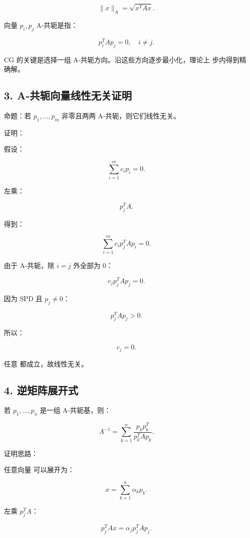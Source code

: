 \documentclass[11pt,a4paper]{ctexart}
\newcommand{\code}[1]{\begingroup\ttfamily\small #1\endgroup}
\begin{document}
\[
\|x\|_A=\sqrt{x^TAx}.
\]

向量 $p_i,p_j$ A-共轭是指：

\[
p_i^TAp_j=0,\quad i\ne j.
\]

CG 的关键是选择一组 A-共轭方向。沿这些方向逐步最小化，理论上 \code{} 步内得到精确解。


\subsection*{3. A-共轭向量线性无关证明}


命题：若 $p_1,\ldots,p_m$ 非零且两两 A-共轭，则它们线性无关。

证明：

假设：

\[
\sum_{i=1}^m c_i p_i=0.
\]

左乘：

\[
p_j^TA.
\]

得到：

\[
\sum_{i=1}^m c_i p_j^TAp_i=0.
\]

由于 A-共轭，除 $i=j$ 外全部为 0：

\[
c_j p_j^TAp_j=0.
\]

因为 \code{} SPD 且 $p_j\ne 0$：

\[
p_j^TAp_j>0.
\]

所以：

\[
c_j=0.
\]

任意 \code{} 都成立，故线性无关。


\subsection*{4. 逆矩阵展开式}


若 $p_1,\ldots,p_n$ 是一组 A-共轭基，则：

\[
A^{-1}=\sum_{k=1}^n\frac{p_kp_k^T}{p_k^TAp_k}.
\]

证明思路：

任意向量 \code{} 可以展开为：

\[
x=\sum_{k=1}^n \alpha_k p_k.
\]

左乘 $p_j^TA$：

\[
p_j^TAx=\alpha_j p_j^TAp_j.
\]
\end{document}
